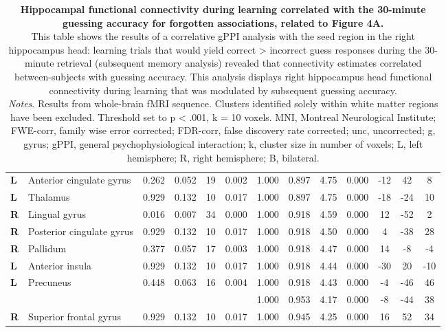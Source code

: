 \begin{landscape}
\begin{table}[!ht]
\begin{tabular}{ll|cccc|cccc|ccc}
        \textbf{L} & Anterior cingulate gyrus & 0.262 & 0.052 & 19 & 0.002 & 1.000 & 0.897 & 4.75 & 0.000 & -12 & 42 & 8 \\
        \textbf{L} & Thalamus & 0.929 & 0.132 & 10 & 0.017 & 1.000 & 0.897 & 4.75 & 0.000 & -18 & -24 & 10 \\
        \textbf{R} & Lingual gyrus & 0.016 & 0.007 & 34 & 0.000 & 1.000 & 0.918 & 4.59 & 0.000 & 12 & -52 & 2 \\
        \textbf{R} & Posterior cingulate gyrus & 0.929 & 0.132 & 10 & 0.017 & 1.000 & 0.918 & 4.50 & 0.000 & 4 & -38 & 28 \\
        \textbf{R} & Pallidum  & 0.377 & 0.057 & 17 & 0.003 & 1.000 & 0.918 & 4.47 & 0.000 & 14 & -8 & -4 \\
        \textbf{L} & Anterior insula & 0.929 & 0.132 & 10 & 0.017 & 1.000 & 0.918 & 4.44 & 0.000 & -30 & 20 & -10 \\
        \textbf{L} & Precuneus & 0.448 & 0.063 & 16 & 0.004 & 1.000 & 0.918 & 4.43 & 0.000 & -4 & -46 & 46 \\
        \textbf{} & & & & & & 1.000 & 0.953 & 4.17 & 0.000 & -8 & -44 & 38 \\
        \textbf{R} & Superior frontal gyrus & 0.929 & 0.132 & 10 & 0.017 & 1.000 & 0.945 & 4.25 & 0.000 & 16 & 52 & 34 \\ \hline
    \end{tabular}
    \vspace{1.0 em}
    \caption{\textbf{Hippocampal functional connectivity  during learning correlated with the 30-minute guessing accuracy for forgotten associations, related to Figure 4A.} \\
    This table shows the results of a correlative gPPI analysis with the seed region in the right hippocampus head: learning trials that would yield correct > incorrect guess responses during the 30-minute retrieval (subsequent memory analysis) revealed that connectivity estimates correlated between-subjects with guessing accuracy.
    This analysis displays right hippocampus head functional connectivity during learning that was modulated by subsequent guessing accuracy.\\
    \vspace{1.0 em} \textit{Notes}. Results from whole-brain fMRI sequence. Clusters identified solely within white matter regions have been excluded. Threshold set to p < .001, k = 10 voxels. MNI, Montreal Neurological Institute; FWE-corr, family wise error corrected; FDR-corr, false discovery rate corrected; unc, uncorrected; g, gyrus; gPPI, general psychophysiological interaction; k, cluster size in number of voxels; L, left hemisphere; R, right hemisphere; B, bilateral.}
    \label{tab:Encoding_unconscious_gPPI}
\end{table}
\end{landscape}
